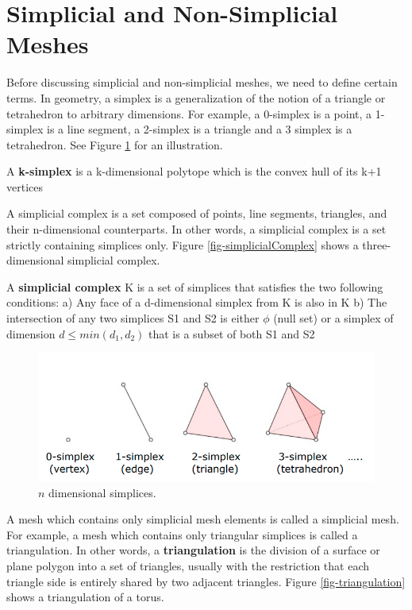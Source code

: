 \section{Simplicial and Non-Simplicial Meshes}
\label{sec-simplicial}

Before discussing simplicial and non-simplicial meshes, we need to define certain terms. In geometry, a simplex is a generalization of the notion of a triangle or tetrahedron to arbitrary dimensions. For example, a 0-simplex is a point, a 1-simplex is a line segment, a 2-simplex is a triangle and a 3 simplex is a tetrahedron. See Figure \ref{fig-simplices} for an illustration.

\begin{definition}
A \textbf{k-simplex} is a k-dimensional polytope which is the convex hull of its k+1 vertices
\end{definition}

A simplicial complex is a set composed of points, line segments, triangles, and their n-dimensional counterparts. In other words, a simplicial complex is a set strictly containing simplices only. Figure \ref{fig-simplicialComplex} shows a three-dimensional simplicial complex.

\begin{definition}
A \textbf{simplicial complex} K
is a set of simplices that
satisfies the two following
conditions:
a) Any face of a d-dimensional simplex
 from K is also in K
b) The intersection of any
 two simplices S1 and S2
 is either $\phi$ (null set) or a simplex of dimension $d \leq min(d_1, d_2)$ that is a subset of
 both S1 and S2
\end{definition}

\begin{figure}
	\centering
	\includegraphics[width=0.95\linewidth]{img/intro/simplices.png}
	\caption{$n$ dimensional simplices.}
	\label{fig-simplices}
\end{figure}

A mesh which contains only simplicial mesh elements is called a simplicial mesh. For example, a mesh which contains only triangular simplices is called a triangulation. In other words, a \textbf{triangulation} is the division of a surface or plane polygon into a set of triangles, usually with the restriction that each triangle side is entirely shared by two adjacent triangles. Figure \ref{fig-triangulation} shows a triangulation of a torus.

